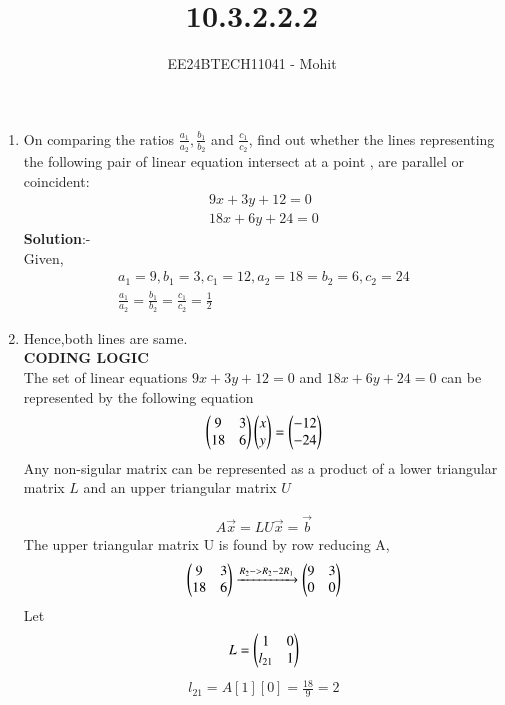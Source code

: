 \documentclass[journal]{IEEEtran}
\numberwithin{equation}{enumi}
\numberwithin{figure}{enumi}
\begin{document}

\title{10.3.2.2.2}
\author{EE24BTECH11041 - Mohit}
{\let\newpage\relax\maketitle}
\begin{enumerate}
\item On comparing the ratios $\frac{a_1}{a_2},\frac{b_1}{b_2}$ and $\frac{c_1}{c_2}$, find out whether the lines representing the following pair of linear equation intersect at a point , are parallel or coincident:\\
\begin{align}
9x + 3y + 12 = 0 \\
18x + 6y + 24 = 0
\end{align}
\textbf{Solution}:-\\
Given,
\begin{align}
a_1=9,b_1=3,c_1=12,a_2=18=b_2=6,c_2=24 \\
\frac{a_1}{a_2}=\frac{b_1}{b_2}=\frac{c_1}{c_2}=\frac{1}{2}
\end{align}
\item Hence,both lines are same.\\
\textbf{CODING LOGIC}\\



The set of linear equations $9x + 3y + 12 = 0$ and $18x + 6y + 24 = 0$ can be represented by the following equation
\begin{align}
    \begin{pmatrix}9&3\\18&6\end{pmatrix}\begin{pmatrix}x\\y\end{pmatrix}=\begin{pmatrix}-12\\-24\end{pmatrix}
\end{align}
Any non-sigular matrix can be represented as a product of a lower triangular matrix $L$ and an
upper triangular matrix $U$

\begin{align}
    A\vec{x} = LU\vec{x} = \vec{b}
\end{align}
The upper triangular matrix U is found by row reducing A,
\begin{align}
   \begin{pmatrix}9&3\\18&6\end{pmatrix} \xrightarrow{R_2 -> R_2 - 2R_1 }\begin{pmatrix}9&3\\0&0\end{pmatrix}  
\end{align}
Let 
\begin{align}
    L = \begin{pmatrix}1 & 0\\ l_{21} & 1\end{pmatrix}
\end{align}
\begin{align}
l_{21} = A[1][0]=\frac{18}{9}=2
\end{align}



\end{enumerate}
\end{document}
